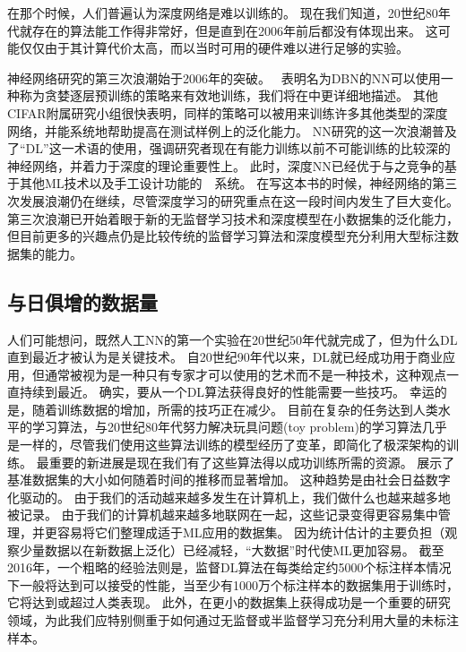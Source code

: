 
在那个时候，人们普遍认为深度网络是难以训练的。
现在我们知道，20世纪80年代就存在的算法能工作得非常好，但是直到在2006年前后都没有体现出来。
这可能仅仅由于其计算代价太高，而以当时可用的硬件难以进行足够的实验。

神经网络研究的第三次浪潮始于2006年的突破。
~表明名为\gls{DBN}的\gls{NN}可以使用一种称为贪婪逐层预训练的策略来有效地训练\citep{Hinton06}，我们将在中更详细地描述。
其他CIFAR附属研究小组很快表明，同样的策略可以被用来训练许多其他类型的深度网络\citep{Bengio-NIPS2007,ranzato-07-small}，并能系统地帮助提高在测试样例上的泛化能力。
\gls{NN}研究的这一次浪潮普及了``\gls{DL}''这一术语的使用，强调研究者现在有能力训练以前不可能训练的比较深的神经网络，并着力于深度的理论重要性上\citep{Bengio+Lecun-chapter2007,Delalleau+Bengio-2011-small,Pascanu-et-al-ICLR2014,Montufar-et-al-NIPS2014}。
此时，深度\gls{NN}已经优于与之竞争的基于其他\gls{ML}技术以及手工设计功能的~~系统。
在写这本书的时候，神经网络的第三次发展浪潮仍在继续，尽管深度学习的研究重点在这一段时间内发生了巨大变化。
第三次浪潮已开始着眼于新的无监督学习技术和深度模型在小数据集的泛化能力，但目前更多的兴趣点仍是比较传统的监督学习算法和深度模型充分利用大型标注数据集的能力。

\subsection{与日俱增的数据量}
\label{sec:increasing_dataset_sizes}
人们可能想问，既然人工\gls{NN}的第一个实验在20世纪50年代就完成了，但为什么\gls{DL}直到最近才被认为是关键技术。
自20世纪90年代以来，\gls{DL}就已经成功用于商业应用，但通常被视为是一种只有专家才可以使用的艺术而不是一种技术，这种观点一直持续到最近。
确实，要从一个\gls{DL}算法获得良好的性能需要一些技巧。
幸运的是，随着训练数据的增加，所需的技巧正在减少。
目前在复杂的任务达到人类水平的学习算法，与20世纪80年代努力解决玩具问题(toy problem)的学习算法几乎是一样的，尽管我们使用这些算法训练的模型经历了变革，即简化了极深架构的训练。
最重要的新进展是现在我们有了这些算法得以成功训练所需的资源。
展示了基准数据集的大小如何随着时间的推移而显著增加。
这种趋势是由社会日益数字化驱动的。
由于我们的活动越来越多发生在计算机上，我们做什么也越来越多地被记录。
由于我们的计算机越来越多地联网在一起，这些记录变得更容易集中管理，并更容易将它们整理成适于\gls{ML}应用的数据集。
因为统计估计的主要负担（观察少量数据以在新数据上泛化）已经减轻，``大数据''时代使\gls{ML}更加容易。
截至2016年，一个粗略的经验法则是，监督\gls{DL}算法在每类给定约5000个标注样本情况下一般将达到可以接受的性能，当至少有1000万个标注样本的数据集用于训练时，它将达到或超过人类表现。
此外，在更小的数据集上获得成功是一个重要的研究领域，为此我们应特别侧重于如何通过无监督或半监督学习充分利用大量的未标注样本。


